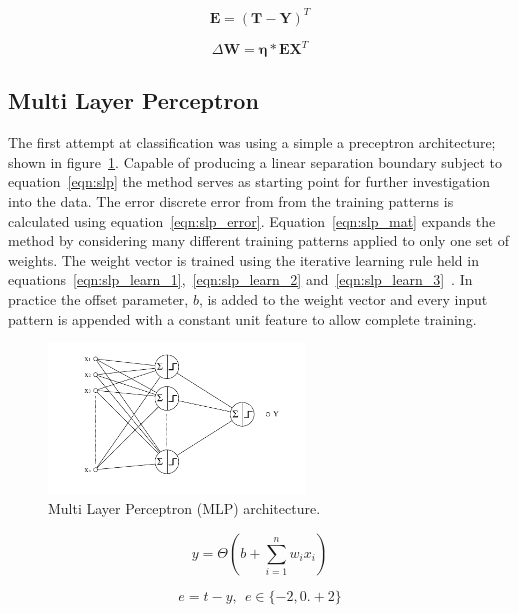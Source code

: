 \documentclass{ecsarticle}     %
\begin{document}
\begin{equation}	
	\mathbf{E} = (\mathbf{T} - \mathbf{Y})^{T}
	\label{eqn:slp_learn_2}
\end{equation}

\begin{equation}	
	\Delta \mathbf{W} = \mathbf{\eta}*\mathbf{E}\mathbf{X}^T
	\label{eqn:slp_learn_3}
\end{equation}


\subsection{Multi Layer Perceptron}


The first attempt at classification was using a simple a preceptron architecture; shown in figure~\ref{fig:slp}.
Capable of producing a linear separation boundary subject to equation~\eqref{eqn:slp} the method serves as starting point for further investigation into the data.
The error discrete error from from the training patterns is calculated using equation~\eqref{eqn:slp_error}.
Equation~\eqref{eqn:slp_mat} expands the method by considering many different training patterns applied to only one set of weights.
The weight vector is trained using the iterative learning rule held in equations~\eqref{eqn:slp_learn_1},~\eqref{eqn:slp_learn_2} and~\eqref{eqn:slp_learn_3}~\citep{info05mackay}.
In practice the offset parameter, $b$, is added to the weight vector and every input pattern is appended with a constant unit feature to allow complete training.

\begin{figure}[ht]
   \centering
    \includegraphics[height = 4cm]{MLP.pdf}
   \caption{Multi Layer Perceptron (MLP) architecture.}
   \label{fig:slp}
\end{figure}

\begin{equation}
   y = \Theta \left(b + \sum_{i=1}^{n} w_i x_i \right)
   \label{eqn:slp}
\end{equation}

\begin{equation}	
	e = t - y,\:\:e \in \{-2,0.+2\}
	\label{eqn:slp_error}
\end{equation}
\end{document}
